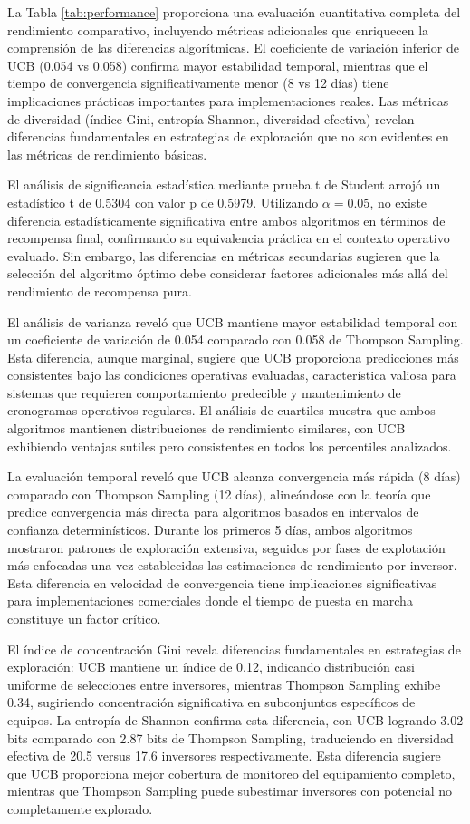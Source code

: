 \documentclass[conference]{IEEEtran}
\begin{document}
La Tabla \ref{tab:performance} proporciona una evaluación cuantitativa completa del rendimiento comparativo, incluyendo métricas adicionales que enriquecen la comprensión de las diferencias algorítmicas. El coeficiente de variación inferior de UCB (0.054 vs 0.058) confirma mayor estabilidad temporal, mientras que el tiempo de convergencia significativamente menor (8 vs 12 días) tiene implicaciones prácticas importantes para implementaciones reales. Las métricas de diversidad (índice Gini, entropía Shannon, diversidad efectiva) revelan diferencias fundamentales en estrategias de exploración que no son evidentes en las métricas de rendimiento básicas.

El análisis de significancia estadística mediante prueba t de Student arrojó un estadístico t de 0.5304 con valor p de 0.5979. Utilizando $\alpha = 0.05$, no existe diferencia estadísticamente significativa entre ambos algoritmos en términos de recompensa final, confirmando su equivalencia práctica en el contexto operativo evaluado. Sin embargo, las diferencias en métricas secundarias sugieren que la selección del algoritmo óptimo debe considerar factores adicionales más allá del rendimiento de recompensa pura.

El análisis de varianza reveló que UCB mantiene mayor estabilidad temporal con un coeficiente de variación de 0.054 comparado con 0.058 de Thompson Sampling. Esta diferencia, aunque marginal, sugiere que UCB proporciona predicciones más consistentes bajo las condiciones operativas evaluadas, característica valiosa para sistemas que requieren comportamiento predecible y mantenimiento de cronogramas operativos regulares. El análisis de cuartiles muestra que ambos algoritmos mantienen distribuciones de rendimiento similares, con UCB exhibiendo ventajas sutiles pero consistentes en todos los percentiles analizados.

La evaluación temporal reveló que UCB alcanza convergencia más rápida (8 días) comparado con Thompson Sampling (12 días), alineándose con la teoría que predice convergencia más directa para algoritmos basados en intervalos de confianza determinísticos. Durante los primeros 5 días, ambos algoritmos mostraron patrones de exploración extensiva, seguidos por fases de explotación más enfocadas una vez establecidas las estimaciones de rendimiento por inversor. Esta diferencia en velocidad de convergencia tiene implicaciones significativas para implementaciones comerciales donde el tiempo de puesta en marcha constituye un factor crítico.

El índice de concentración Gini revela diferencias fundamentales en estrategias de exploración: UCB mantiene un índice de 0.12, indicando distribución casi uniforme de selecciones entre inversores, mientras Thompson Sampling exhibe 0.34, sugiriendo concentración significativa en subconjuntos específicos de equipos. La entropía de Shannon confirma esta diferencia, con UCB logrando 3.02 bits comparado con 2.87 bits de Thompson Sampling, traduciendo en diversidad efectiva de 20.5 versus 17.6 inversores respectivamente. Esta diferencia sugiere que UCB proporciona mejor cobertura de monitoreo del equipamiento completo, mientras que Thompson Sampling puede subestimar inversores con potencial no completamente explorado.
\end{document}
